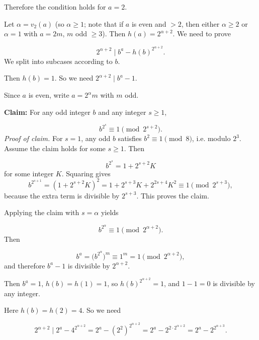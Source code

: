 Therefore the condition holds for \(a=2\).\par
{}
Let \(\alpha = v_{2}(a)\) (so \(\alpha\ge1\); note that if \(a\) is even and \(>2\), then either \(\alpha\ge2\) or \(\alpha=1\) with \(a=2m\), \(m\) odd \(\ge3\)). Then \(h(a)=2^{\alpha+2}\). We need to prove\par
\[
  2^{\alpha+2} \mid b^{a} - h(b)^{2^{\alpha+2}}.
  \]
We split into subcases according to \(b\).\par
{}
Then \(h(b)=1\). So we need \(2^{\alpha+2}\mid b^{a}-1\).\par
Since \(a\) is even, write \(a = 2^{\alpha} m\) with \(m\) odd.\par
\textbf{Claim:} For any odd integer \(b\) and any integer \(s\ge1\),\par
\[
    b^{2^{s}} \equiv 1 \pmod{2^{s+2}}.
    \]
\emph{Proof of claim.} For \(s=1\), any odd \(b\) satisfies \(b^{2}\equiv1\pmod8\), i.e. modulo \(2^{3}\). Assume the claim holds for some \(s\ge1\). Then\par
\[
    b^{2^{s}} = 1 + 2^{s+2} K
\]
for some integer \(K\). Squaring gives
\[
    b^{2^{s+1}} = (1 + 2^{s+2} K)^{2} = 1 + 2^{s+3} K + 2^{2s+4} K^{2} \equiv 1 \pmod{2^{s+3}},
\]
because the extra term is divisible by \(2^{s+3}\). This proves the claim.\par
Applying the claim with \(s=\alpha\) yields\par
\[
    b^{2^{\alpha}} \equiv 1 \pmod{2^{\alpha+2}}.
    \]
Then\par
\[
    b^{a} = \bigl(b^{2^{\alpha}}\bigr)^{m} \equiv 1^{m} = 1 \pmod{2^{\alpha+2}},
    \]
and therefore \(b^{a}-1\) is divisible by \(2^{\alpha+2}\).\par
{}
Then \(b^{a}=1\), \(h(b)=h(1)=1\), so \(h(b)^{2^{\alpha+2}}=1\), and \(1-1=0\) is divisible by any integer.\par
{}
Here \(h(b)=h(2)=4\). So we need\par
\[
    2^{\alpha+2} \mid 2^{a} - 4^{2^{\alpha+2}} = 2^{a} - (2^{2})^{2^{\alpha+2}} = 2^{a} - 2^{2\cdot 2^{\alpha+2}} = 2^{a} - 2^{2^{\alpha+3}}.
    \]

